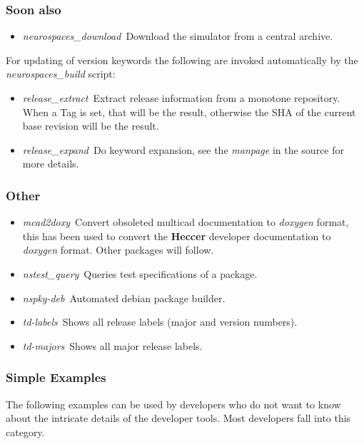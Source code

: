 \documentclass[12pt]{article}
\begin{document}
\subsubsection*{Soon also}

\begin{itemize}
	\item {\it neurospaces\_download}\,\,\,Download the simulator from a central archive.
\end{itemize}
For updating of version keywords the following are invoked automatically by the {\it neurospaces\_build} script:
\begin{itemize}
	\item {\it release\_extract}\,\,\,Extract release information from a monotone repository. When a Tag is set, that will be the result, otherwise the SHA of the current base revision will be the result.
	\item {\it release\_expand}\,\,\,Do keyword expansion, see the {\it manpage} in the source for more details. 
\end{itemize}

\subsubsection*{Other}

\begin{itemize}
\item {\it mcad2doxy}\,\,\,Convert obsoleted multicad documentation to
  {\it doxygen} format, this has been used to convert the {\bf Heccer}
  developer documentation to {\it doxygen} format. Other packages will
  follow.
\item {\it nstest\_query}\,\,\,Queries test specifications of a package.
\item {\it nspkg-deb}\,\,\,Automated debian package builder.
\item {\it td-labels}\,\,\,Shows all release labels (major and version numbers).
\item {\it td-majors}\,\,\,Shows all major release labels.
\end{itemize}

\subsubsection*{Simple Examples}

The following examples can be used by developers who do not want to
know about the intricate details of the developer tools.  Most
developers fall into this category.
\end{document}

